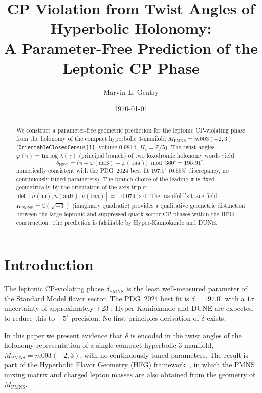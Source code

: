 \documentclass[11pt,a4paper]{article}
\theoremstyle{definition}
\theoremstyle{remark}
\newcommand{\MPMNS}{M_{\mathrm{PMNS}}}
\newcommand{\KPMNS}{K_{\mathrm{PMNS}}}
\newcommand{\QQ}{\mathbb{Q}}
\newcommand{\Zfive}{\mathbb{Z}/5}
\begin{document}
\title{CP Violation from Twist Angles of Hyperbolic Holonomy:\\
A Parameter-Free Prediction of the Leptonic CP Phase}

\author[1]{Marvin L. Gentry}
\date{\today}

\begin{abstract}
We construct a parameter-free geometric prediction for the leptonic
CP-violating phase from the holonomy of the compact hyperbolic
3-manifold $\MPMNS = m003(-2,3)$ (\texttt{OrientableClosedCensus[1]},
volume $0.9814$, $H_1=\Zfive$).
The twist angles $\varphi(\gamma)=\mathrm{Im}\log\lambda(\gamma)$
(principal branch) of two loxodromic holonomy words yield:
\[
  \delta_{\mathrm{HFG}}
  = \bigl(\pi + \varphi(\mathrm{aaB}) + \varphi(\mathrm{baa})\bigr)
    \bmod 360^\circ
  = 195.91^\circ,
\]
numerically consistent with the PDG~2024 best fit $197.0^\circ$
($0.55\%$ discrepancy, no continuously tuned parameters).
The branch choice of the leading $\pi$ is fixed geometrically by
the orientation of the axis triple:
$\det[\hat{n}(\mathrm{aa}),\hat{n}(\mathrm{aaB}),
\hat{n}(\mathrm{baa})]=+0.079>0$.
The manifold's trace field $\KPMNS=\QQ(\sqrt{-3})$
(imaginary quadratic) provides a qualitative geometric distinction
between the large leptonic and suppressed quark-sector CP phases
within the HFG construction.
The prediction is falsifiable by Hyper-Kamiokande and DUNE.
\end{abstract}

\maketitle

\section{Introduction}
\label{sec:intro}

The leptonic CP-violating phase $\delta_{\mathrm{PMNS}}$ is the
least well-measured parameter of the Standard Model flavor sector.
The PDG~2024 best fit is $\delta=197.0^\circ$ with a $1\sigma$
uncertainty of approximately $\pm23^\circ$; Hyper-Kamiokande and
DUNE are expected to reduce this to $\pm5^\circ$ precision.
No first-principles derivation of $\delta$ exists.

In this paper we present evidence that $\delta$ is encoded in the
twist angles of the holonomy representation of a single compact
hyperbolic 3-manifold, $\MPMNS=m003(-2,3)$, with no continuously
tuned parameters.
The result is part of the Hyperbolic Flavor Geometry (HFG)
framework~\cite{Gentry:Unified}, in which the PMNS mixing matrix
and charged lepton masses are also obtained from the geometry of
$\MPMNS$.
\end{document}
